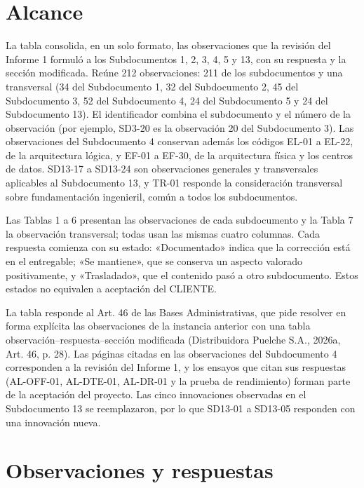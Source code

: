 \documentclass[carta,firma]{lafrox}
\begin{document}
\portadalafrox
\indicelafrox
\listatablaslafrox
{}
\section{Alcance}
La tabla consolida, en un solo formato, las observaciones que la revisión del Informe 1 formuló a los Subdocumentos 1, 2, 3, 4, 5 y 13, con su respuesta y la sección modificada. Reúne 212 observaciones: 211 de los subdocumentos y una transversal (34 del Subdocumento 1, 32 del Subdocumento 2, 45 del Subdocumento 3, 52 del Subdocumento 4, 24 del Subdocumento 5 y 24 del Subdocumento 13). El identificador combina el subdocumento y el número de la observación (por ejemplo, SD3-20 es la observación 20 del Subdocumento 3). Las observaciones del Subdocumento 4 conservan además los códigos EL-01 a EL-22, de la arquitectura lógica, y EF-01 a EF-30, de la arquitectura física y los centros de datos. SD13-17 a SD13-24 son observaciones generales y transversales aplicables al Subdocumento 13, y TR-01 responde la consideración transversal sobre fundamentación ingenieril, común a todos los subdocumentos.

Las Tablas 1 a 6 presentan las observaciones de cada subdocumento y la Tabla 7 la observación transversal; todas usan las mismas cuatro columnas. Cada respuesta comienza con su estado: «Documentado» indica que la corrección está en el entregable; «Se mantiene», que se conserva un aspecto valorado positivamente, y «Trasladado», que el contenido pasó a otro subdocumento. Estos estados no equivalen a aceptación del CLIENTE.

La tabla responde al Art. 46 de las Bases Administrativas, que pide resolver en forma explícita las observaciones de la instancia anterior con una tabla observación–respuesta–sección modificada (Distribuidora Puelche S.A., 2026a, Art. 46, p. 28). Las páginas citadas en las observaciones del Subdocumento 4 corresponden a la revisión del Informe 1, y los ensayos que citan sus respuestas (AL-OFF-01, AL-DTE-01, AL-DR-01 y la prueba de rendimiento) forman parte de la aceptación del proyecto. Las cinco innovaciones observadas en el Subdocumento 13 se reemplazaron, por lo que SD13-01 a SD13-05 responden con una innovación nueva.

\clearpage
{}
\section{Observaciones y respuestas}
\end{document}
